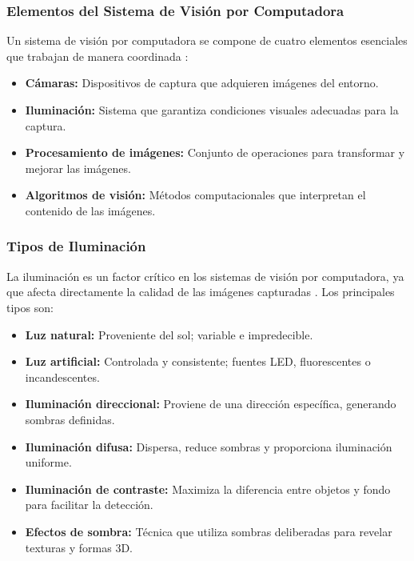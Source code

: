 \documentclass[12pt,letterpaper]{article}
\begin{document}
\subsubsection{Elementos del Sistema de Visión por Computadora}

Un sistema de visión por computadora se compone de cuatro elementos esenciales
que trabajan de manera coordinada \citep{gonzalez2018digital}:

\begin{itemize}[leftmargin=1.5cm]
    \item \textbf{Cámaras:} Dispositivos de captura que adquieren imágenes del entorno.
    \item \textbf{Iluminación:} Sistema que garantiza condiciones visuales adecuadas para la captura.
    \item \textbf{Procesamiento de imágenes:} Conjunto de operaciones para transformar y mejorar las imágenes.
    \item \textbf{Algoritmos de visión:} Métodos computacionales que interpretan el contenido de las imágenes.
\end{itemize}

\subsubsection{Tipos de Iluminación}

La iluminación es un factor crítico en los sistemas de visión por computadora, ya que
afecta directamente la calidad de las imágenes capturadas \citep{baxes1994digital}. Los
principales tipos son:

\begin{itemize}[leftmargin=1.5cm]
    \item \textbf{Luz natural:} Proveniente del sol; variable e impredecible.
    \item \textbf{Luz artificial:} Controlada y consistente; fuentes LED, fluorescentes o incandescentes.
    \item \textbf{Iluminación direccional:} Proviene de una dirección específica, generando sombras definidas.
    \item \textbf{Iluminación difusa:} Dispersa, reduce sombras y proporciona iluminación uniforme.
    \item \textbf{Iluminación de contraste:} Maximiza la diferencia entre objetos y fondo para facilitar la detección.
    \item \textbf{Efectos de sombra:} Técnica que utiliza sombras deliberadas para revelar texturas y formas 3D.
\end{itemize}
\end{document}
